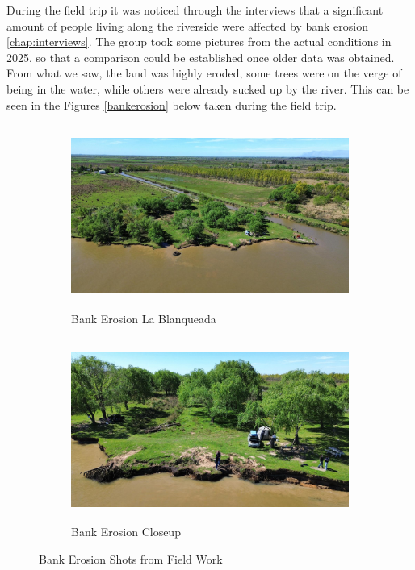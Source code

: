 During the field trip it was noticed through the interviews that a significant amount of people living along the riverside were affected by bank erosion \ref{chap:interviews}. The group took some pictures from the actual conditions in 2025, so that a comparison could be established once older data was obtained. From what we saw, the land was highly eroded, some trees were on the verge of being in the water, while others were already sucked up by the river. This can be seen in the Figures \ref{bankerosion} below taken during the field trip.

\begin{figure}[H]
    \centering
    \begin{subfigure}[b]{0.6\textwidth}
        \includegraphics[width=\linewidth, height=6cm]{figures/ch4/bankerosioncamping.jpg}
        \caption{Bank Erosion La Blanqueada}
        \label{fig:sontek}
    \end{subfigure}
    
    \vspace{0.5cm}
    

    \begin{subfigure}[b]{0.6\textwidth}
        \includegraphics[width=\linewidth, height=6cm]{figures/ch4/bankerosioncamping2.jpg}
        \caption{Bank Erosion Closeup}
        \label{fig:sontek}
    \end{subfigure}
    \caption{Bank Erosion Shots from Field Work}
    \label{fig:Bank Erosion shots from field work}
\end{figure}
\label{bankerosion}


